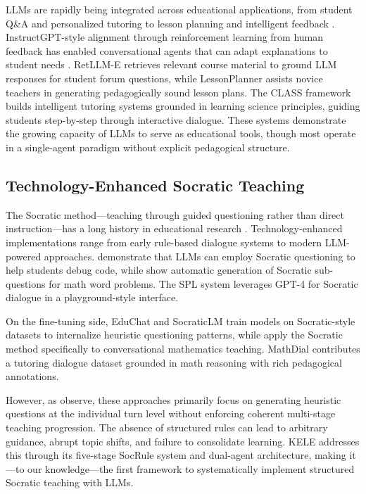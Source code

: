 \documentclass[11pt]{article}
\begin{document}
LLMs are rapidly being integrated across educational applications, from student Q\&A and personalized tutoring to lesson planning and intelligent feedback \citep{kasneci2023chatgpt, gan2023llmedu}. InstructGPT-style alignment through reinforcement learning from human feedback has enabled conversational agents that can adapt explanations to student needs \citep{chung2024scaling}. RetLLM-E \citep{mitra2024retllm} retrieves relevant course material to ground LLM responses for student forum questions, while LessonPlanner \citep{fan2024lessonplanner} assists novice teachers in generating pedagogically sound lesson plans. The CLASS framework \citep{sonkar2023class} builds intelligent tutoring systems grounded in learning science principles, guiding students step-by-step through interactive dialogue. These systems demonstrate the growing capacity of LLMs to serve as educational tools, though most operate in a single-agent paradigm without explicit pedagogical structure.

\subsection{Technology-Enhanced Socratic Teaching}

The Socratic method---teaching through guided questioning rather than direct instruction---has a long history in educational research \citep{seeskin1987socratic, chang1998socratic}. Technology-enhanced implementations range from early rule-based dialogue systems \citep{graesser2004autotutor} to modern LLM-powered approaches. \citet{alhossami2024socratic} demonstrate that LLMs can employ Socratic questioning to help students debug code, while \citet{shridhar2022mathword} show automatic generation of Socratic sub-questions for math word problems. The SPL system \citep{zhang2024spl} leverages GPT-4 for Socratic dialogue in a playground-style interface.

On the fine-tuning side, EduChat \citep{dan2023educhat} and SocraticLM \citep{liu2024socraticLM} train models on Socratic-style datasets to internalize heuristic questioning patterns, while \citet{ding2024socraticmath} apply the Socratic method specifically to conversational mathematics teaching. MathDial \citep{macina2023mathdial} contributes a tutoring dialogue dataset grounded in math reasoning with rich pedagogical annotations.

However, as \citet{peng2025kele} observe, these approaches primarily focus on generating heuristic questions at the individual turn level without enforcing coherent multi-stage teaching progression. The absence of structured rules can lead to arbitrary guidance, abrupt topic shifts, and failure to consolidate learning. KELE addresses this through its five-stage SocRule system and dual-agent architecture, making it---to our knowledge---the first framework to systematically implement structured Socratic teaching with LLMs.
\end{document}
